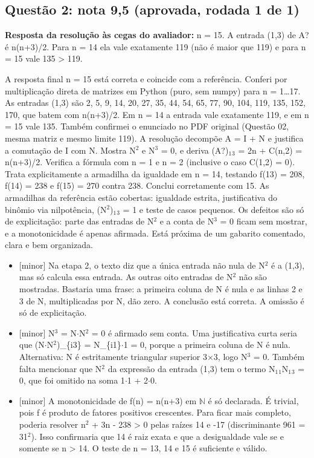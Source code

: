 \documentclass{article}%
\begin{document}
\subsection*{Questão 2: nota 9,5 (aprovada, rodada 1 de 1)}%
\textbf{Resposta da resolução às cegas do avaliador:} n = 15. A entrada (1,3) de A? é n(n+3)/2. Para n = 14 ela vale exatamente 119 (não é maior que 119) e para n = 15 vale 135 > 119.\par %
A resposta final n = 15 está correta e coincide com a referência. Conferi por multiplicação direta de matrizes em Python (puro, sem numpy) para n = 1\ldots{}17. As entradas (1,3) são 2, 5, 9, 14, 20, 27, 35, 44, 54, 65, 77, 90, 104, 119, 135, 152, 170, que batem com n(n+3)/2. Em n = 14 a entrada vale exatamente 119, e em n = 15 vale 135. Também confirmei o enunciado no PDF original (Questão 02, mesma matriz e mesmo limite 119). A resolução decompõe A = I + N e justifica a comutação de I com N. Mostra N$^2$ e N$^3$ = 0, e deriva (A?)$_{1}$$_{3}$ = 2n + C(n,2) = n(n+3)/2. Verifica a fórmula com n = 1 e n = 2 (inclusive o caso C(1,2) = 0). Trata explicitamente a armadilha da igualdade em n = 14, testando f(13) = 208, f(14) = 238 e f(15) = 270 contra 238. Conclui corretamente com 15. As armadilhas da referência estão cobertas: igualdade estrita, justificativa do binômio via nilpotência, (N$^2$)$_{1}$$_{3}$ = 1 e teste de casos pequenos. Os defeitos são só de explicitação: parte das entradas de N$^2$ e a conta de N$^3$ = 0 ficam sem mostrar, e a monotonicidade é apenas afirmada. Está próxima de um gabarito comentado, clara e bem organizada.%
\begin{itemize}%
\item%
{[}minor{]} Na etapa 2, o texto diz que a única entrada não nula de N$^2$ é a (1,3), mas só calcula essa entrada. As outras oito entradas de N$^2$ não são mostradas. Bastaria uma frase: a primeira coluna de N é nula e as linhas 2 e 3 de N, multiplicadas por N, dão zero. A conclusão está correta. A omissão é só de explicitação.%
\item%
{[}minor{]} N$^3$ = N$\cdot$N$^2$ = 0 é afirmado sem conta. Uma justificativa curta seria que (N$\cdot$N$^2$)\_\{i3\} = N\_\{i1\}$\cdot$1 = 0, porque a primeira coluna de N é nula. Alternativa: N é estritamente triangular superior 3$\times$3, logo N$^3$ = 0. Também falta mencionar que N$^2$ da expressão da entrada (1,3) tem o termo N$_{1}$$_{1}$N$_{1}$$_{3}$ = 0, que foi omitido na soma 1$\cdot$1 + 2$\cdot$0.%
\item%
{[}minor{]} A monotonicidade de f(n) = n(n+3) em $\mathbb{N}$ é só declarada. É trivial, pois f é produto de fatores positivos crescentes. Para ficar mais completo, poderia resolver n$^2$ + 3n - 238 > 0 pelas raízes 14 e -17 (discriminante 961 = 31$^2$). Isso confirmaria que 14 é raiz exata e que a desigualdade vale se e somente se n > 14. O teste de n = 13, 14 e 15 é suficiente e válido.%
\end{itemize}%
\end{document}
